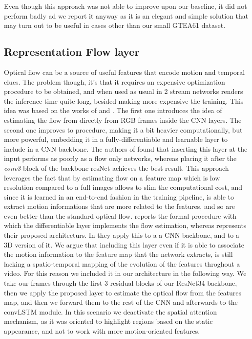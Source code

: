 \documentclass[10pt,twocolumn,hidelinks,letterpaper]{article}
\begin{document}
Even though this approach was not able to improve upon our baseline, it did not perform
badly ad we report it anyway as it is an elegant and simple solution that may turn out to be useful in cases other than our small GTEA61 dataset.

\subsection{Representation Flow layer}
Optical flow can be a source of useful features that encode motion and temporal clues.
The problem though, it's that it requires an expensive optimization procedure to be obtained, and when used as usual in 2 stream networks renders the inference time quite long, besided making more expensive the training.
This idea was based on the works of \cite{motfilt} and \cite{reprflow}. The first one
introduces the idea of estimating the flow from directly from RGB frames inside the CNN layers. The second one improves to procedure, making it a bit heavier computationally, but more powerful, embedding it in a fully-differentiable and learnable layer to include in a CNN backbone. The authors of \cite{reprflow} found that inserting this layer at the input performs as poorly as a flow only networks, whereas placing it after the \textit{conv3} block of the backbone resNet achieves the best result. This approach leverages the
fact that by estimating flow on a feature map which is low resolution compared to a full images allows to slim the computational cost, and since it is learned in an end-to-end fashion in the training pipeline, is able to extract motion informations that are more related to the features, and so are even better than the standard optical flow.  reports the formal procedure with which the differentiable layer implements the flow estimation, whereas  represents their proposed architecturs.
In \cite{reprflow} they apply this to a a CNN backbone, and to a 3D version of it. We argue that including this layer even if it is able to associate the motion information to the feature map that the network extracts, is still lacking a spatio-temporal mapping of the evolution of the features throghout a video. For this reason we included it in
our architecture in the following way.
We take our frames through the first 3 residual blocks of our ResNet34 backbone, then
we apply the proposed layer to estimate the optical flow from the features map, and then
we forward them to the rest of the CNN and afterwards to the convLSTM module. In
this scenario we deactivate the spatial attention mechanism, as it was oriented to
highlight regions based on the static appearance, and not to work with more motion-oriented features.
\end{document}
